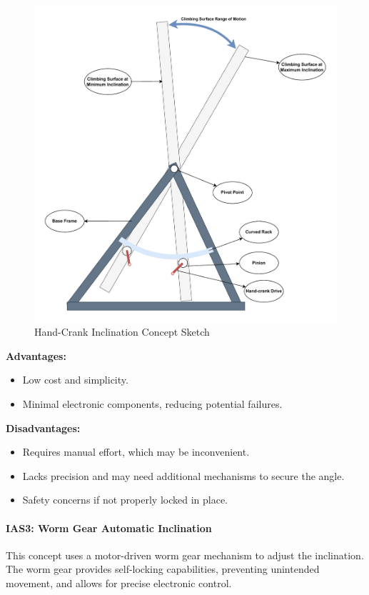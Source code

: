 \begin{figure}[H]
    \centering
    \includegraphics[width=0.6\linewidth]{figs/concept_design/Handcrank_Concept.pdf}
    \caption{Hand-Crank Inclination Concept Sketch}
    \label{fig:handcrank-concept}
\end{figure}

\textbf{Advantages:}
\begin{itemize}
    \item Low cost and simplicity.
    \item Minimal electronic components, reducing potential failures.
\end{itemize}

\textbf{Disadvantages:}
\begin{itemize}
    \item Requires manual effort, which may be inconvenient.
    \item Lacks precision and may need additional mechanisms to secure the angle.
    \item Safety concerns if not properly locked in place.
\end{itemize}

\paragraph{IAS3: Worm Gear Automatic Inclination}

This concept uses a motor-driven worm gear mechanism to adjust the inclination. The worm gear provides self-locking capabilities, preventing unintended movement, and allows for precise electronic control.

